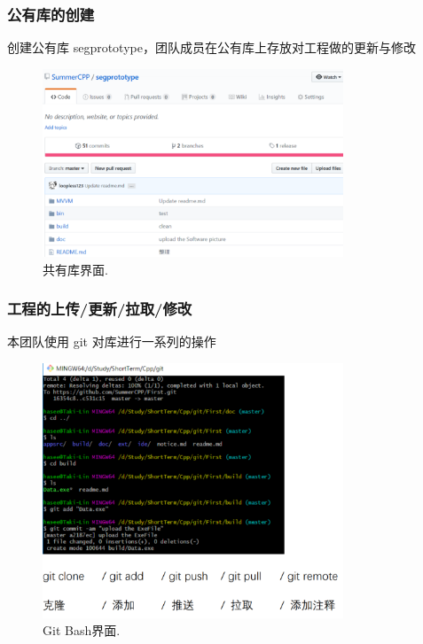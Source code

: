 \documentclass[14pt,a4paper]{article}
\begin{document}
\subsubsection{公有库的创建}
创建公有库 segprototype，团队成员在公有库上存放对工程做的更新与修改
\nopagebreak
\begin{figure}[h]
\begin{center}
\includegraphics[width=0.8\textwidth]{image/seg} 
\caption{共有库界面.}
\end{center}
\end{figure}

\newpage
\subsubsection{工程的上传/更新/拉取/修改}
本团队使用 git 对库进行一系列的操作
\nopagebreak
\begin{figure}[h]
\nopagebreak
\begin{center}
\nopagebreak
\includegraphics[width=0.8\textwidth]{image/term} 
\caption{Git Bash界面.}
\end{center}
\end{figure}
\end{document}
